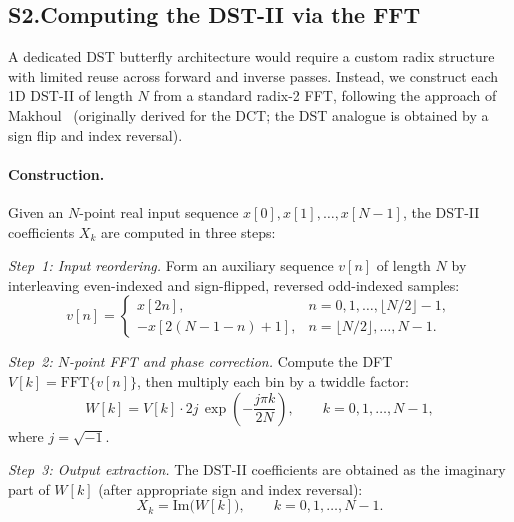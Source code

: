 \documentclass[10pt,a4paper]{article}
\begin{document}
\subsection*{S2.\quad Computing the DST-II via the FFT}

A dedicated DST butterfly architecture would require a custom radix structure with limited reuse across forward and inverse passes. Instead, we construct each 1D DST-II of length $N$ from a standard radix-2 FFT, following the approach of Makhoul~\cite{makhoul1980fct} (originally derived for the DCT; the DST analogue is obtained by a sign flip and index reversal).

\paragraph{Construction.}
Given an $N$-point real input sequence $x[0], x[1], \ldots, x[N{-}1]$, the DST-II coefficients $X_k$ are computed in three steps:

\textit{Step~1: Input reordering.} Form an auxiliary sequence $v[n]$ of length $N$ by interleaving even-indexed and sign-flipped, reversed odd-indexed samples:
\begin{equation}
  v[n] =
  \begin{cases}
    x[2n],          & n = 0, 1, \ldots, \lfloor N/2 \rfloor - 1, \\[2pt]
    -x[2(N-1-n)+1], & n = \lfloor N/2 \rfloor, \ldots, N-1.
  \end{cases}
  \label{eq:s_reorder}
\end{equation}

\textit{Step~2: $N$-point FFT and phase correction.} Compute the DFT $V[k] = \mathrm{FFT}\{v[n]\}$, then multiply each bin by a twiddle factor:
\begin{equation}
  W[k] = V[k] \cdot 2j \, \exp\!\left(-\frac{j\pi k}{2N}\right), \qquad k = 0, 1, \ldots, N-1,
  \label{eq:s_phase}
\end{equation}
where $j = \sqrt{-1}$.

\textit{Step~3: Output extraction.} The DST-II coefficients are obtained as the imaginary part of $W[k]$ (after appropriate sign and index reversal):
\begin{equation}
  X_k = \mathrm{Im}\!\bigl(W[k]\bigr), \qquad k = 0, 1, \ldots, N-1.
  \label{eq:s_extract}
\end{equation}
\end{document}

